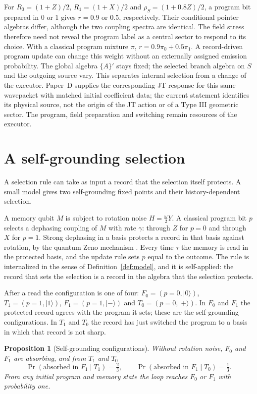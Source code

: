 \documentclass[12pt,a4paper]{article}
\newtheorem{proposition}[theorem]{Proposition}
\newcommand{\ket}[1]{|#1\rangle}
\begin{document}
For $R_0=(1+Z)/2$, $R_1=(1+X)/2$ and $\rho_S=(1+0.8Z)/2$, a program bit prepared in $0$ or $1$ gives $r=0.9$ or $0.5$, respectively. Their conditional pointer algebras differ, although the two coupling spectra are identical. The field stress therefore need not reveal the program label as a central sector to respond to its choice. With a classical program mixture $\pi$, $r=0.9\pi_0+0.5\pi_1$. A record-driven program update can change this weight without an externally assigned emission probability. The global algebra $\{A\}'$ stays fixed; the selected branch algebra on $S$ and the outgoing source vary. This separates internal selection from a change of the executor. Paper~D supplies the corresponding JT response for this same wavepacket with matched initial coefficient data; the current statement identifies its physical source, not the origin of the JT action or of a Type III geometric sector. The program, field preparation and switching remain resources of the executor.

\section{A self-grounding selection}
\label{sec:loop}

A selection rule can take as input a record that the selection itself protects. A small model gives two self-grounding fixed points and their history-dependent selection.

A memory qubit $M$ is subject to rotation noise $H=\frac\omega2Y$. A classical program bit $p$ selects a dephasing coupling of $M$ with rate $\gamma$: through $Z$ for $p=0$ and through $X$ for $p=1$. Strong dephasing in a basis protects a record in that basis against rotation, by the quantum Zeno mechanism \cite{MisraSudarshan1977,FacchiPascazio2002}. Every time $\tau$ the memory is read in the protected basis, and the update rule sets $p$ equal to the outcome. The rule is internalized in the sense of Definition~\ref{def:model}, and it is self-applied: the record that sets the selection is a record in the algebra that the selection protects.

After a read the configuration is one of four: $F_0=(p=0,\ket0)$, $T_1=(p=1,\ket1)$, $F_1=(p=1,\ket-)$ and $T_0=(p=0,\ket+)$. In $F_0$ and $F_1$ the protected record agrees with the program it sets; these are the self-grounding configurations. In $T_1$ and $T_0$ the record has just switched the program to a basis in which that record is not sharp.

\begin{proposition}[Self-grounding configurations]
\label{prop:loop}
Without rotation noise, $F_0$ and $F_1$ are absorbing, and from $T_1$ and $T_0$
\[
\Pr(\text{absorbed in }F_1\mid T_1)=\tfrac23,\qquad\Pr(\text{absorbed in }F_1\mid T_0)=\tfrac13 .
\]
From any initial program and memory state the loop reaches $F_0$ or $F_1$ with probability one.
\end{proposition}
\end{document}
